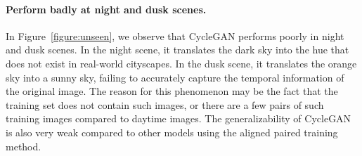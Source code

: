 \paragraph{Perform badly at night and dusk scenes.} In Figure~\ref{figure:unseen}, we observe that CycleGAN performs poorly in night and dusk scenes. In the night scene, it translates the dark sky into the hue that does not exist in real-world cityscapes. In the dusk scene, it translates the orange sky into a sunny sky, failing to accurately capture the temporal information of the original image. The reason for this phenomenon may be the fact that the training set does not contain such images, or there are a few pairs of such training images compared to daytime images. The generalizability of CycleGAN is also very weak compared to other models using the aligned paired training method.

